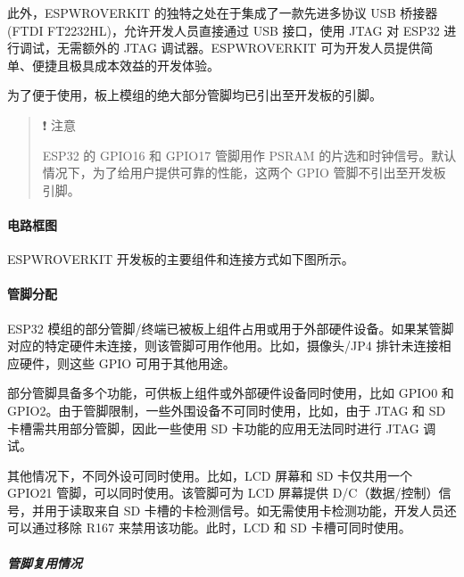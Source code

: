\documentclass[a4paper,12pt,english]{sphinxmanual}
\begin{document}
\sphinxAtStartPar
此外，ESP\sphinxhyphen{}WROVER\sphinxhyphen{}KIT 的独特之处在于集成了一款先进多协议 USB 桥接器 (FTDI FT2232HL)，允许开发人员直接通过 USB 接口，使用 JTAG 对 ESP32 进行调试，无需额外的 JTAG 调试器。ESP\sphinxhyphen{}WROVER\sphinxhyphen{}KIT 可为开发人员提供简单、便捷且极具成本效益的开发体验。

\sphinxAtStartPar
为了便于使用，板上模组的绝大部分管脚均已引出至开发板的引脚。
\begin{quote}

\sphinxAtStartPar
❗ 注意

\sphinxAtStartPar
ESP32 的 GPIO16 和 GPIO17 管脚用作 PSRAM 的片选和时钟信号。默认情况下，为了给用户提供可靠的性能，这两个 GPIO 管脚不引出至开发板引脚。
\end{quote}


\paragraph{电路框图}
\label{\detokenize{exp-esp32/ide/esp-idf-setup:id3}}
\sphinxAtStartPar
ESP\sphinxhyphen{}WROVER\sphinxhyphen{}KIT 开发板的主要组件和连接方式如下图所示。

\sphinxAtStartPar
{}


\paragraph{管脚分配}
\label{\detokenize{exp-esp32/ide/esp-idf-setup:id4}}
\sphinxAtStartPar
ESP32 模组的部分管脚/终端已被板上组件占用或用于外部硬件设备。如果某管脚对应的特定硬件未连接，则该管脚可用作他用。比如，摄像头/JP4 排针未连接相应硬件，则这些 GPIO 可用于其他用途。

\sphinxAtStartPar
部分管脚具备多个功能，可供板上组件或外部硬件设备同时使用，比如 GPIO0 和 GPIO2。由于管脚限制，一些外围设备不可同时使用，比如，由于 JTAG 和 SD 卡槽需共用部分管脚，因此一些使用 SD 卡功能的应用无法同时进行 JTAG 调试。

\sphinxAtStartPar
其他情况下，不同外设可同时使用。比如，LCD 屏幕和 SD 卡仅共用一个 GPIO21 管脚，可以同时使用。该管脚可为 LCD 屏幕提供 D/C（数据/控制）信号，并用于读取来自 SD 卡槽的卡检测信号。如无需使用卡检测功能，开发人员还可以通过移除 R167 来禁用该功能。此时，LCD 和 SD 卡槽可同时使用。


\subparagraph{管脚复用情况}
\label{\detokenize{exp-esp32/ide/esp-idf-setup:id5}}
\sphinxAtStartPar
{}
\end{document}
